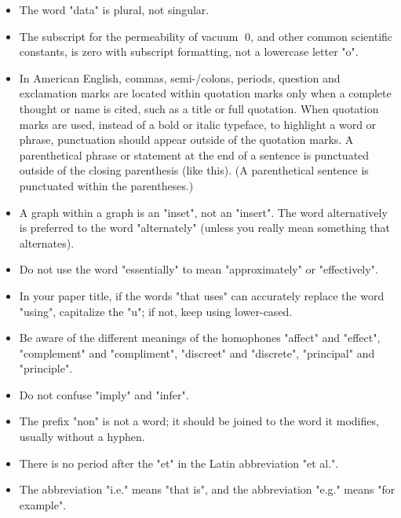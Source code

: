 \documentclass[conference]{IEEEtran}
\begin{document}
\begin{itemize}
	\item The word "data" is plural, not singular. 
	
	\item The subscript for the permeability of vacuum 0, and other common scientific constants, is zero with subscript formatting, not a lowercase letter "o".
	
	\item In American English, commas, semi-/colons, periods, question and exclamation marks are located within quotation marks only when a complete thought or name is cited, such as a title or full quotation. When quotation marks are used, instead of a bold or italic typeface, to highlight a word or phrase, punctuation should appear outside of the quotation marks. A parenthetical phrase or statement at the end of a sentence is punctuated outside of the closing parenthesis (like this). (A parenthetical sentence is punctuated within the parentheses.)
	
	\item A graph within a graph is an "inset", not an "insert". The word alternatively is preferred to the word "alternately" (unless you really mean something that alternates).
	
	\item Do not use the word "essentially" to mean "approximately" or "effectively".
	
	\item In your paper title, if the words "that uses" can accurately replace the word "using", capitalize the "u"; if not, keep using lower-cased.
	
	\item Be aware of the different meanings of the homophones "affect" and "effect", "complement" and "compliment", "discreet" and "discrete", "principal" and "principle".
	
	\item Do not confuse "imply" and "infer".
	
	\item The prefix "non" is not a word; it should be joined to the word it modifies, usually without a hyphen.
	
	\item There is no period after the "et" in the Latin abbreviation "et al.".
	
	\item The abbreviation "i.e." means "that is", and the abbreviation "e.g." means "for example".
	
\end{itemize} 
\end{document}
